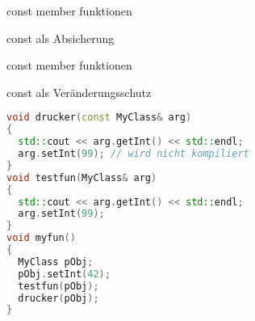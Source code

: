 
\begin{frame}[fragile]{const member funktionen}

\begin{block}{const als Absicherung}
  
\end{block}

\end{frame}

\begin{frame}[fragile]{const member funktionen}

\begin{block}{const als Veränderungsschutz}
\begin{small}
	\begin{lstlisting}[language=C++]
void drucker(const MyClass& arg)
{
  std::cout << arg.getInt() << std::endl;
  arg.setInt(99); // wird nicht kompiliert
}
void testfun(MyClass& arg)
{
  std::cout << arg.getInt() << std::endl;
  arg.setInt(99);
}
void myfun()
{
  MyClass pObj;
  pObj.setInt(42);
  testfun(pObj);
  drucker(pObj);
}
	\end{lstlisting}
	\end{small}
\end{block}

\end{frame}
